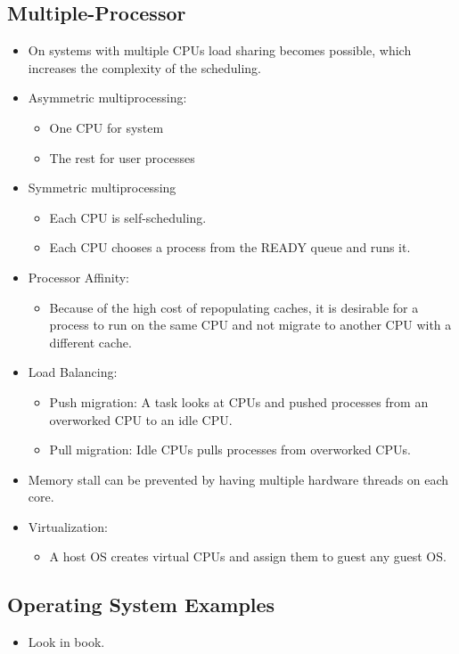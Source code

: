 \documentclass[a4wide,10pt]{article}
\begin{document}
\subsection{Multiple-Processor} %
\label{sub:multiple_processor}
\begin{itemize}
	\item On systems with multiple CPUs load sharing becomes possible, which increases the complexity of the scheduling.
	\item Asymmetric multiprocessing:
	\begin{itemize}
		\item One CPU for system
		\item The rest for user processes
	\end{itemize}
	\item Symmetric multiprocessing
	\begin{itemize}
		\item Each CPU is self-scheduling.
		\item Each CPU chooses a process from the READY queue and runs it.
	\end{itemize}
	\item Processor Affinity:
	\begin{itemize}
		\item Because of the high cost of repopulating caches, it is desirable for a process to run on the same CPU and not migrate to another CPU with a different cache.
	\end{itemize}
	\item Load Balancing:
	\begin{itemize}
		\item Push migration: A task looks at CPUs and pushed processes from an overworked CPU to an idle CPU.
		\item Pull migration: Idle CPUs pulls processes from overworked CPUs.
	\end{itemize}
	\item Memory stall can be prevented by having multiple hardware threads on each core.
	\item Virtualization:
	\begin{itemize}
		\item A host OS creates virtual CPUs and assign them to guest any guest OS.
	\end{itemize}
\end{itemize}

\subsection{Operating System Examples} %
\label{sub:operating_system_examples}
\begin{itemize}
	\item Look in book.
\end{itemize}
\end{document}
